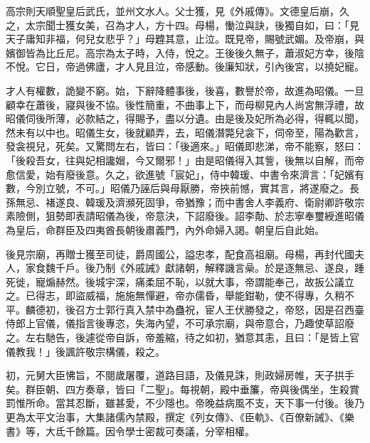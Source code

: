 \begin{pinyinscope}
 高宗則天順聖皇后武氏，並州文水人。父士獲，見《外戚傳》。文德皇后崩，久之，太宗聞士獲女美，召為才人，方十四。母楊，慟泣與訣，後獨自如，曰：「見天子庸知非福，何兒女悲乎？」母韙其意，止泣。既見帝，賜號武媚。及帝崩，與嬪御皆為比丘尼。高宗為太子時，入侍，悅之。王後後久無子，蕭淑妃方幸，後陰不悅。它日，帝過佛廬，才人見且泣，帝感動。後廉知狀，引內後宮，以撓妃寵。



 才人有權數，詭變不窮。始，下辭降體事後，後喜，數譽於帝，故進為昭儀。一旦顧幸在蕭後，寢與後不協。後性簡重，不曲事上下，而母柳見內人尚宮無浮禮，故昭儀伺後所薄，必款結之，得賜予，盡以分遺。由是後及妃所為必得，得輒以聞，然未有以中也。昭儀生女，後就顧弄，去，昭儀潛斃兒衾下，伺帝至，陽為歡言，發衾視兒，死矣。又驚問左右，皆曰：「後適來。」昭儀即悲涕，帝不能察，怒曰：「後殺吾女，往與妃相讒媢，今又爾邪！」由是昭儀得入其訾，後無以自解，而帝愈信愛，始有廢後意。久之，欲進號「宸妃」，侍中韓瑗、中書令來濟言：「妃嬪有數，今別立號，不可。」昭儀乃誣后與母厭勝，帝挾前憾，實其言，將遂廢之。長孫無忌、褚遂良、韓瑗及濟瀕死固爭，帝猶豫；而中書舍人李義府、衛尉卿許敬宗素險側，狙勢即表請昭儀為後，帝意決，下詔廢後。詔李勣、於志寧奉璽綬進昭儀為皇后，命群臣及四夷酋長朝後肅義門，內外命婦入謁。朝皇后自此始。



 後見宗廟，再贈士獲至司徒，爵周國公，謚忠孝，配食高祖廟。母楊，再封代國夫人，家食魏千戶。後乃制《外戚誡》獻諸朝，解釋譏言喿。於是逐無忌、遂良，踵死徙，寵煽赫然。後城宇深，痛柔屈不恥，以就大事，帝謂能奉己，故扳公議立之。已得志，即盜威福，施施無憚避，帝亦儒昏，舉能鉗勒，使不得專，久稍不平。麟德初，後召方士郭行真入禁中為蠱祝，宦人王伏勝發之，帝怒，因是召西臺侍郎上官儀，儀指言後專恣，失海內望，不可承宗廟，與帝意合，乃趣使草詔廢之。左右馳告，後遽從帝自訴，帝羞縮，待之如初，猶意其恚，且曰：「是皆上官儀教我！」後諷許敬宗構儀，殺之。



 初，元舅大臣怫旨，不閱歲屠覆，道路目語，及儀見誅，則政婦房帷，天子拱手矣。群臣朝、四方奏章，皆曰「二聖」。每視朝，殿中垂簾，帝與後偶坐，生殺賞罰惟所命。當其忍斷，雖甚愛，不少隱也。帝晚益病風不支，天下事一付後。後乃更為太平文治事，大集諸儒內禁殿，撰定《列女傳》、《臣軌》、《百僚新誡》、《樂書》等，大氐千餘篇。因令學士密裁可奏議，分宰相權。




\end{pinyinscope}
